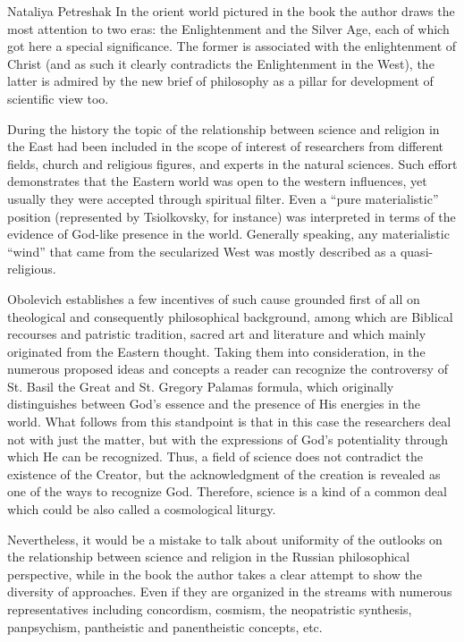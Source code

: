\begin{recengenv}{Nataliya Petreshak}
In the orient world pictured in the book the author draws the most attention to two eras: the Enlightenment and the Silver Age,
each of
which got here a special significance. The former is associated with the enlightenment of Christ (and as such it
clearly
contradicts the Enlightenment in the West), the latter is admired by the new brief of philosophy as a pillar for
development of scientific view too.


During the history the topic of the relationship between science and religion in the East had been included in the
scope of interest of researchers from different fields, church and religious figures, and experts in the natural sciences. Such
effort demonstrates that the Eastern world was open to the western influences, yet usually they were accepted through
spiritual filter. Even a ``pure materialistic'' position (represented by Tsiolkovsky, for instance)
was interpreted in terms of the evidence of
God-like presence in the world. Generally speaking, any materialistic ``wind'' that came from the secularized West was mostly
described as a quasi-religious.


Obolevich establishes a few incentives of such cause grounded first of all on theological and consequently
philosophical background, among which are Biblical recourses and patristic tradition, sacred art and literature and
which mainly originated from the Eastern thought.
Taking them into consideration, in the numerous proposed ideas and concepts a reader can recognize
the controversy of St. Basil the Great and St. Gregory Palamas
formula, which originally distinguishes between God’s essence and the presence of His energies in the world.
What follows from this standpoint is that in this case the researchers deal not with just the matter, but with the
expressions of God’s potentiality through which He can be recognized. Thus, a field of science does not
contradict the existence of the Creator, but the acknowledgment of the creation is revealed as one of the ways to
recognize God. Therefore, science is a kind of a common deal which could be also called a cosmological liturgy.


Nevertheless, it would be a mistake to talk about uniformity of the outlooks on the relationship between science and religion in
the Russian philosophical perspective, while in the book the author takes a clear attempt to show the diversity of
approaches. Even if they are organized in the streams with numerous representatives including concordism, cosmism, the
neopatristic synthesis, panpsychism, pantheistic and panentheistic concepts, etc.



\end{recengenv}
